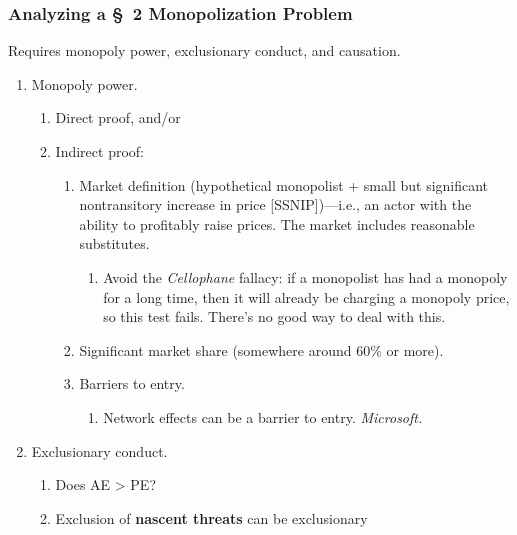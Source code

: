 \subsubsection{Analyzing a \S\ 2 Monopolization Problem}

Requires monopoly power, exclusionary conduct, and causation.

\begin{enumerate}
    \item Monopoly power.
    \begin{enumerate}
        \item Direct proof, and/or
        \item Indirect proof:
        \begin{enumerate}
            \item Market definition (hypothetical monopolist + small but 
            significant nontransitory increase in price [SSNIP])---i.e., an 
            actor with the ability to profitably raise prices. The market 
            includes reasonable substitutes.
            \begin{enumerate}
                \item Avoid the \emph{Cellophane} fallacy: if a monopolist has 
                had a monopoly for a long time, then it will already be 
                charging a monopoly price, so this test fails. There's no good 
                way to deal with this.
            \end{enumerate}
            \item Significant market share (somewhere around 60\% or more).
            \item Barriers to entry.
            \begin{enumerate}
                \item Network effects can be a barrier to entry. 
                \emph{Microsoft.}
            \end{enumerate}
        \end{enumerate}
    \end{enumerate}
    \item Exclusionary conduct.
    \begin{enumerate}
        \item Does AE > PE?
        \item Exclusion of \textbf{nascent threats} can be exclusionary 

\end{enumerate}
\end{enumerate}
